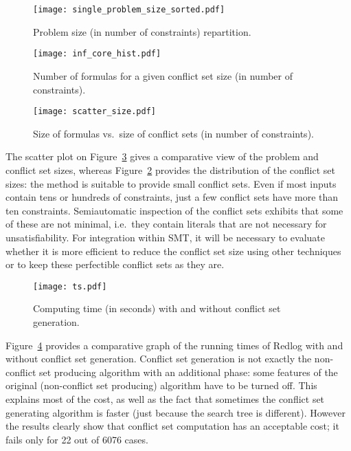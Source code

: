 \documentclass{llncs}
\begin{document}
\begin{figure}
  \centering
    \texttt{[image: single\_problem\_size\_sorted.pdf]}
  \caption{\label{fig:exp1}Problem size (in number of constraints) repartition.}
\end{figure} 



\begin{figure}
  \centering
    \texttt{[image: inf\_core\_hist.pdf]}

    \caption{\label{fig:exp2}Number of formulas for a given conflict set size
      (in number of constraints).}
\end{figure}

\begin{figure}
  \centering
    \texttt{[image: scatter\_size.pdf]}
    \caption{\label{fig:exp3}Size of formulas vs.\ size of conflict sets (in
      number of constraints).}
\end{figure}

The scatter plot on Figure~\ref{fig:exp3} gives a comparative view of the
problem and conflict set sizes, whereas Figure~\ref{fig:exp2} provides the
distribution of the conflict set sizes: the method is suitable to provide small
conflict sets.  Even if most inputs contain tens or hundreds of constraints,
just a few conflict sets have more than ten constraints.  Semiautomatic
inspection of the conflict sets exhibits that some of these are not minimal,
i.e.\ they contain literals that are not necessary for unsatisfiability.  For
integration within SMT, it will be necessary to evaluate whether it is more
efficient to reduce the conflict set size using other techniques or to keep
these perfectible conflict sets as they are.

\begin{figure}
  \centering
    \texttt{[image: ts.pdf]}
  \caption{\label{fig:exp4}Computing time (in seconds) with and without conflict
    set generation.}
\end{figure}

Figure~\ref{fig:exp4} provides a comparative graph of the running times of
Redlog with and without conflict set generation.  Conflict set generation is not
exactly the non-conflict set producing algorithm with an additional phase: some
features of the original (non-conflict set producing) algorithm have to be
turned off.  This explains most of the cost, as well as the fact that sometimes
the conflict set  generating algorithm is faster (just because the search tree is
different). However the results clearly show that conflict set computation has an
acceptable cost; it fails only for 22 out of 6076 cases.
\end{document}
